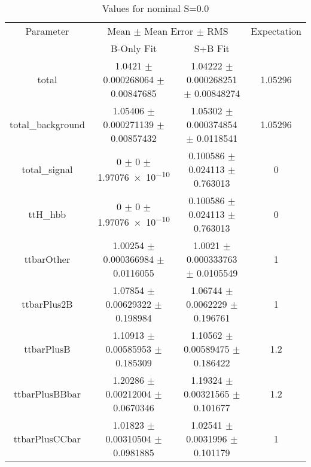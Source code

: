 \begin{table}
\centering
\caption{Values for nominal S=0.0}
\begin{tabular}{cccc}
\toprule
Parameter & \multicolumn{2}{c}{Mean $\pm$ Mean Error $\pm$ RMS} & Expectation\\
 & B-Only Fit & S+B Fit & \\
\midrule
total & \num{1.0421} $\pm$ \num{0.000268064} $\pm$ \num{0.00847685} & \num{1.04222} $\pm$ \num{0.000268251} $\pm$ \num{0.00848274} & \num{1.05296}\\
total\_background & \num{1.05406} $\pm$ \num{0.000271139} $\pm$ \num{0.00857432} & \num{1.05302} $\pm$ \num{0.000374854} $\pm$ \num{0.0118541} & \num{1.05296}\\
total\_signal & \num{0} $\pm$ \num{0} $\pm$ \num{1.97076e-10} & \num{0.100586} $\pm$ \num{0.024113} $\pm$ \num{0.763013} & \num{0}\\
ttH\_hbb & \num{0} $\pm$ \num{0} $\pm$ \num{1.97076e-10} & \num{0.100586} $\pm$ \num{0.024113} $\pm$ \num{0.763013} & \num{0}\\
ttbarOther & \num{1.00254} $\pm$ \num{0.000366984} $\pm$ \num{0.0116055} & \num{1.0021} $\pm$ \num{0.000333763} $\pm$ \num{0.0105549} & \num{1}\\
ttbarPlus2B & \num{1.07854} $\pm$ \num{0.00629322} $\pm$ \num{0.198984} & \num{1.06744} $\pm$ \num{0.0062229} $\pm$ \num{0.196761} & \num{1}\\
ttbarPlusB & \num{1.10913} $\pm$ \num{0.00585953} $\pm$ \num{0.185309} & \num{1.10562} $\pm$ \num{0.00589475} $\pm$ \num{0.186422} & \num{1.2}\\
ttbarPlusBBbar & \num{1.20286} $\pm$ \num{0.00212004} $\pm$ \num{0.0670346} & \num{1.19324} $\pm$ \num{0.00321565} $\pm$ \num{0.101677} & \num{1.2}\\
ttbarPlusCCbar & \num{1.01823} $\pm$ \num{0.00310504} $\pm$ \num{0.0981885} & \num{1.02541} $\pm$ \num{0.0031996} $\pm$ \num{0.101179} & \num{1}\\
\bottomrule
\end{tabular}
\end{table}